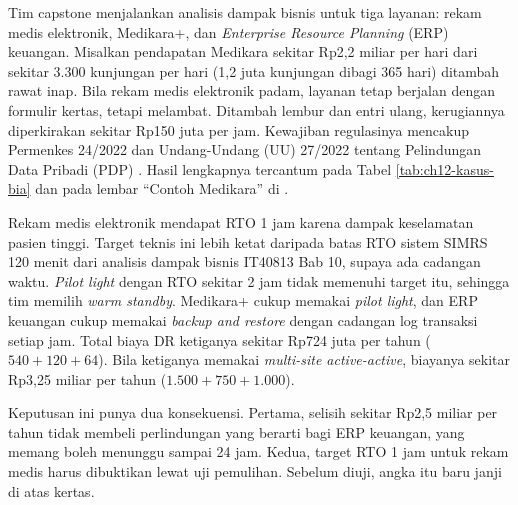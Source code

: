 \begin{kasus}[title={Kasus Medikara Health: RTO dan RPO untuk Tiga Layanan}]
  Tim capstone menjalankan analisis dampak bisnis untuk tiga layanan: rekam medis elektronik,
  Medikara+, dan \textit{Enterprise Resource Planning} (ERP) keuangan. Misalkan pendapatan
  Medikara sekitar Rp2,2 miliar per hari dari sekitar 3.300 kunjungan per hari (1,2 juta kunjungan
  dibagi 365 hari) ditambah rawat inap. Bila rekam medis elektronik padam, layanan tetap berjalan
  dengan formulir kertas, tetapi melambat. Ditambah lembur dan entri ulang, kerugiannya diperkirakan
  sekitar Rp150 juta per jam. Kewajiban regulasinya mencakup Permenkes 24/2022 dan Undang-Undang
  (UU) 27/2022 tentang Pelindungan Data Pribadi (PDP) \cite{uu27-2022-pdp}. Hasil lengkapnya
  tercantum pada Tabel \ref{tab:ch12-kasus-bia} dan
  pada lembar ``Contoh Medikara'' di .

  Rekam medis elektronik mendapat RTO 1 jam karena dampak keselamatan pasien tinggi. Target teknis
  ini lebih ketat daripada batas RTO sistem SIMRS 120 menit dari analisis dampak bisnis IT40813 Bab
  10, supaya ada cadangan waktu. \textit{Pilot light} dengan RTO sekitar 2 jam tidak memenuhi target
  itu, sehingga tim memilih \textit{warm standby}. Medikara+ cukup memakai \textit{pilot light}, dan ERP keuangan cukup memakai
  \textit{backup and restore} dengan cadangan log transaksi setiap jam. Total biaya DR ketiganya
  sekitar Rp724 juta per tahun ($540 + 120 + 64$). Bila ketiganya memakai \textit{multi-site
  active-active}, biayanya sekitar Rp3,25 miliar per tahun ($1.500 + 750 + 1.000$).

  Keputusan ini punya dua konsekuensi. Pertama, selisih sekitar Rp2,5 miliar per tahun tidak
  membeli perlindungan yang berarti bagi ERP keuangan, yang memang boleh menunggu sampai 24 jam.
  Kedua, target RTO 1 jam untuk rekam medis harus dibuktikan lewat uji pemulihan. Sebelum diuji,
  angka itu baru janji di atas kertas.
\end{kasus}

